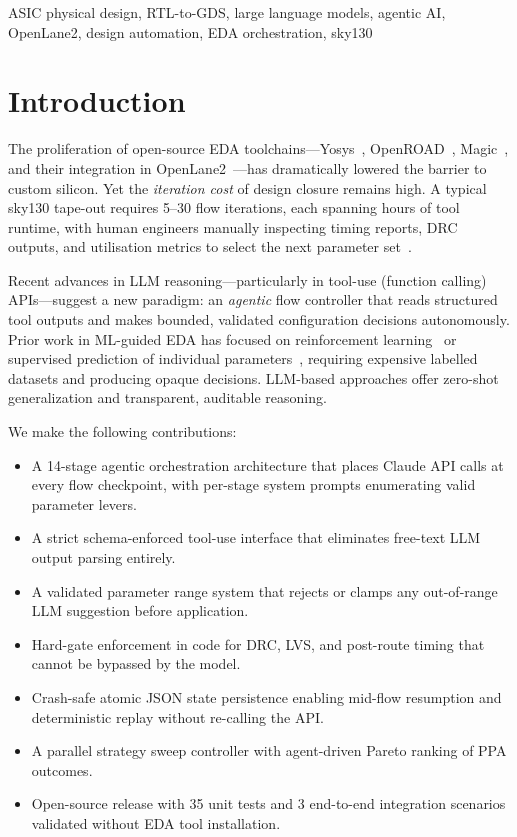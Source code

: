 \documentclass[conference]{IEEEtran}
\begin{document}
\begin{IEEEkeywords}
ASIC physical design, RTL-to-GDS, large language models, agentic AI,
OpenLane2, design automation, EDA orchestration, sky130
\end{IEEEkeywords}

\section{Introduction}

The proliferation of open-source EDA toolchains—Yosys~\cite{wolf2013yosys},
OpenROAD~\cite{kahng2021openroad}, Magic~\cite{ousterhout1984magic}, and
their integration in OpenLane2~\cite{shalan2020openlane}—has dramatically
lowered the barrier to custom silicon.
Yet the \emph{iteration cost} of design closure remains high.
A typical sky130 tape-out requires 5--30 flow iterations, each
spanning hours of tool runtime, with human engineers manually inspecting
timing reports, DRC outputs, and utilisation metrics to select the
next parameter set~\cite{kahng2021openroad}.

Recent advances in LLM reasoning—particularly in tool-use (function
calling) APIs—suggest a new paradigm: an \emph{agentic} flow controller
that reads structured tool outputs and makes bounded, validated
configuration decisions autonomously.
Prior work in ML-guided EDA has focused on reinforcement
learning~\cite{mirhoseini2021chip} or supervised prediction of individual
parameters~\cite{guo2022machine}, requiring expensive labelled datasets and
producing opaque decisions. LLM-based approaches offer zero-shot
generalization and transparent, auditable reasoning.

We make the following contributions:
\begin{itemize}
  \item A 14-stage agentic orchestration architecture that places Claude
        API calls at every flow checkpoint, with per-stage system prompts
        enumerating valid parameter levers.
  \item A strict schema-enforced tool-use interface that eliminates
        free-text LLM output parsing entirely.
  \item A validated parameter range system that rejects or clamps any
        out-of-range LLM suggestion before application.
  \item Hard-gate enforcement in code for DRC, LVS, and post-route
        timing that cannot be bypassed by the model.
  \item Crash-safe atomic JSON state persistence enabling mid-flow
        resumption and deterministic replay without re-calling the API.
  \item A parallel strategy sweep controller with agent-driven
        Pareto ranking of PPA outcomes.
  \item Open-source release with 35 unit tests and 3 end-to-end
        integration scenarios validated without EDA tool installation.
\end{itemize}
\end{document}
